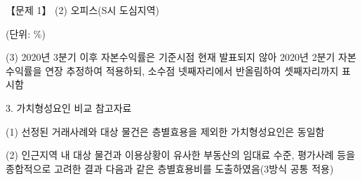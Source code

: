 \begin{longquestion}{【문제 1】}
\medskip\noindent (2) 오피스(S시 도심지역) \par
(단위: \%) \par
{\small\centering\renewcommand{\arraystretch}{1.25}
\par}

\medskip\noindent (3) 2020년 3분기 이후 자본수익률은 기준시점 현재 발표되지 않아 2020년 2분기 자본수익률을 연장 추정하여 적용하되, 소수점 넷째자리에서 반올림하여 셋째자리까지 표시함 \par
3. 가치형성요인 비교 참고자료 \par
\medskip\noindent (1) 선정된 거래사례와 대상 물건은 층별효용을 제외한 가치형성요인은 동일함 \par
\medskip\noindent (2) 인근지역 내 대상 물건과 이용상황이 유사한 부동산의 임대료 수준, 평가사례 등을 종합적으로 고려한 결과 다음과 같은 층별효용비를 도출하였음(3방식 공통 적용) \par
{\small\centering\renewcommand{\arraystretch}{1.25}
\par}


\end{longquestion}
